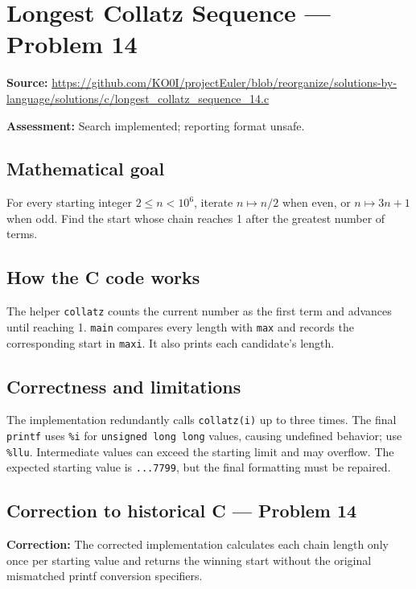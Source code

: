 \section{Longest Collatz Sequence --- Problem 14}
\label{prob:14}
\noindent\textbf{Source:} \url{https://github.com/KO0I/projectEuler/blob/reorganize/solutions-by-language/solutions/c/longest_collatz_sequence_14.c}

\noindent\textbf{Assessment:} Search implemented; reporting format unsafe.

\subsection*{Mathematical goal}
For every starting integer \(2\leq n<10^6\), iterate \(n\mapsto n/2\) when even, or \(n\mapsto3n+1\) when odd. Find the start whose chain reaches 1 after the greatest number of terms.

\subsection*{How the C code works}
The helper \verb|collatz| counts the current number as the first term and advances until reaching 1. \verb|main| compares every length with \verb|max| and records the corresponding start in \verb|maxi|. It also prints each candidate's length.

\subsection*{Correctness and limitations}
The implementation redundantly calls \verb|collatz(i)| up to three times. The final \verb|printf| uses \verb|%i| for \verb|unsigned long long| values, causing undefined behavior; use \verb|%llu|. Intermediate values can exceed the starting limit and may overflow. The expected starting value is \texttt{...7799}, but the final formatting must be repaired.


\subsection*{Correction to historical C --- Problem 14}
{\color{red}\textbf{Correction:} The corrected implementation calculates each chain length only once per starting value and returns the winning start without the original mismatched printf conversion specifiers.}
